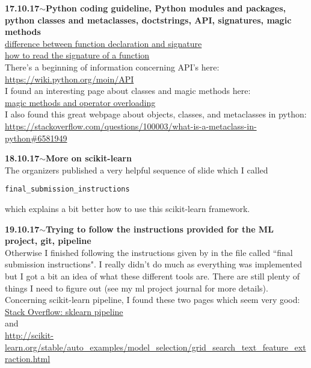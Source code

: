 \documentclass[11pt,a4paper]{article}
\newenvironment{loggentry}[2]%
{\noindent\textbf{#1}\hspace{1cm}$\mathbf{\sim}$\text{ }\textbf{#2}\\}{\vspace{0.5cm}}
\begin{document}
\begin{loggentry}{17.10.17}{Python coding guideline, Python modules and packages, python classes and metaclasses, doctstrings, API, signatures, magic methods}
\href{https://stackoverflow.com/questions/2322736/what-is-the-difference-between-function-declaration-and-signature#2323005}{difference between function declaration and signature}\\
\href{https://stackoverflow.com/questions/2677185/how-can-i-read-a-functions-signature-including-default-argument-values#2677263}{how to read the signature of a function}\\
There's a beginning of information concerning API's here:\\
\url{https://wiki.python.org/moin/API}\\
I found an interesting page about classes and magic methods here:\\
\href{https://www.python-course.eu/python3_magic_methods.php}{magic methods and operator overloading}\\
I also found this great webpage about objects, classes, and metaclasses in python:\\
\url{https://stackoverflow.com/questions/100003/what-is-a-metaclass-in-python#6581949}
\end{loggentry}

\begin{loggentry}{18.10.17}{More on scikit-learn}
The organizers published a very helpful sequence of slide which I called 
\begin{verbatim}
final_submission_instructions
\end{verbatim}
which explains a bit better how to use this scikit-learn framework.
\end{loggentry}

\begin{loggentry}{19.10.17}{Trying to follow the instructions provided for the ML project, git, pipeline}
Otherwise I finished following the instructions given by in the file called ``final submission instructions". I really didn't do much as everything was implemented but I got a bit an idea of what these different tools are. There are still plenty of things I need to figure out (see my ml project journal for more details).\\
Concerning scikit-learn pipeline, I found these two pages which seem very good:\\
\href{https://stackoverflow.com/questions/33091376/python-what-is-exactly-sklearn-pipeline-pipeline#33094099}{Stack Overflow: sklearn pipeline}\\
and\\
\url{http://scikit-learn.org/stable/auto_examples/model_selection/grid_search_text_feature_extraction.html}\\
\end{loggentry}
\end{document}
